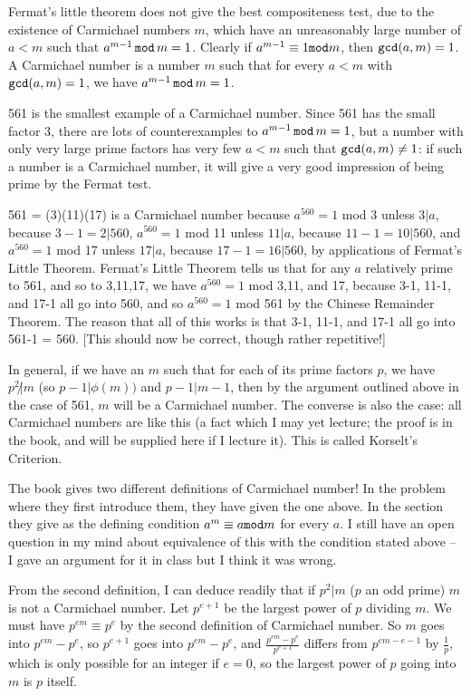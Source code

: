 \documentclass[12pt]{article}
\begin{document}
Fermat's little theorem does not give the best compositeness test, due to the existence of Carmichael numbers  $m$, which have an unreasonably large number of $a<m$ such that $a^{m-1}\,{\tt mod}\,m=1$.   Clearly if $a^{m-1}\equiv 1{\tt mod}m$,
then ${\tt gcd}(a,m)=1$.   A Carmichael number is a number $m$ such that for every $a<m$ with ${\tt gcd}(a,m)=1$, we have $a^{m-1}\,{\tt mod}\,m=1$.

561 is the smallest example of a Carmichael number.   Since 561 has the small factor 3, there are lots of counterexamples to $a^{m-1}\,{\tt mod}\,m=1$, but a number with only very large prime factors has very few $a<m$ such that
${\tt gcd}(a,m) \neq 1$:  if such a number is a Carmichael number, it will give a very good impression of being prime by the Fermat test.

561 = (3)(11)(17) is a Carmichael number because $a^{560}=1$ mod 3 unless $3|a$, because $3-1=2|560$, $a^{560}=1$ mod 11 unless $11|a$, because $11-1=10|560$, and $a^{560}=1$ mod 17 unless $17|a$, because $17-1=16|560$,  by applications of Fermat's Little Theorem.  Fermat's Little Theorem tells us that for any $a$ relatively prime to 561, and so to 3,11,17,
we have $a^{560}=1$ mod 3,11, and 17, because 3-1, 11-1, and 17-1 all go into 560, and so $a^{560}=1$ mod 561 by the Chinese Remainder Theorem.   The reason that all of this works is that 3-1, 11-1, and 17-1 all go into 561-1 = 560.  [This should now be correct, though rather repetitive!]

In general, if we have an $m$ such that for each of its prime factors $p$, we have $p^2 \not| m$ (so $p-1|\phi(m))$ and $p-1 | m-1$, then by the argument outlined above in the case of 561, $m$ will be a Carmichael number.
The converse is also the case:  all Carmichael numbers are like this (a fact which I may yet lecture; the proof is in the book, and will be supplied here if I lecture it).  This is called Korselt's Criterion.

The book gives two different definitions of Carmichael number!   In the problem where they first introduce them, they have given the one above.   In the section they give as the defining condition $a^m \equiv a{\tt mod}m$ for
every $a$.   I still have an open question in my mind about equivalence of this with the condition stated above -- I gave an argument for it in class but I think it was wrong.

From the second definition, I can deduce readily that if $p^2 | m$ ($p$ an odd prime) $m$ is not a Carmichael number.   Let $p^{e+1}$ be the largest power of $p$ dividing $m$.   We must have $p^{em} \equiv p^e$ by the
second definition of Carmichael number.  So $m$ goes into $p^{em}-p^e$, so $p^{e+1}$ goes into  $p^{em}-p^e$, and $\frac{p^{em}-p^e} {p^{e+1}}$ differs from $p^{em-e-1}$ by $\frac 1 p$, which is only possible for an 
integer if $e=0$, so the largest power of $p$ going into $m$ is $p$ itself.
\end{document}
